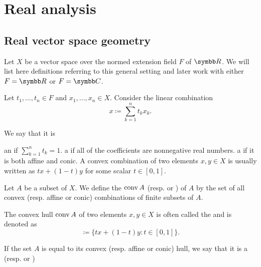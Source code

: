 \section{Real analysis}\label{sec:real_analysis}
\subsection{Real vector space geometry}\label{subsec:real_vector_space_geometry}

\begin{remark}\label{remark:geometry_of_vector_spaces}
  Let \( X \) be a vector space over the normed extension field \( F \) of \( \R \). We will list here definitions referring to this general setting and later work with either \( F = \R \) or \( F = \Co \).
\end{remark}

\begin{definition}\label{def:special_linear_combinations}
  Let \( t_1, \ldots, t_n \in F \) and \( x_1, \ldots, x_n \in X \). Consider the linear combination
  \begin{equation*}
    x \coloneqq \sum_{k=1}^n t_k x_k.
  \end{equation*}

  We say that it is
  \begin{defenum}
     an  if \( \sum_{k=1}^n t_k = 1 \).
     a  if all of the coefficients are nonnegative real numbers.
     a  if it is both affine and conic. A convex combination of two elements \( x, y \in X \) is usually written as \( tx + (1-t)y \) for some scalar \( t \in [0, 1] \).
  \end{defenum}
\end{definition}

\begin{definition}\label{def:linear_combination_hulls}
  Let \( A \) be a subset of \( X \). We define the  \( \operatorname{conv} A \) (resp.  or ) of \( A \) by the set of all convex (resp. affine or conic) combinations of finite subsets of \( A \).

  The convex hull \( \operatorname{conv} A \) of two elements \( x, y \in X \) is often called the  and is denoted as
  \begin{equation*}
    [x, y] \coloneqq \{ tx + (1-t)y \colon t \in [0, 1] \}.
  \end{equation*}

  If the set \( A \) is equal to its convex (resp. affine or conic) hull, we say that it is a  (resp.  or )
\end{definition}

